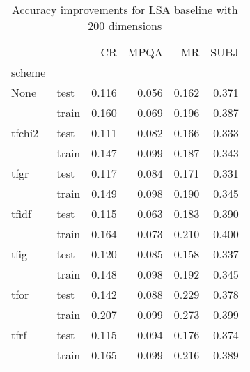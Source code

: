 \begin{table}[H]
\begin{center}

\begin{tabular}{llrrrr}
\toprule
{} &      &  CR &  MPQA &  MR &  SUBJ \\
scheme &  &            &              &            &              \\
\midrule
None & test &      0.116 &        0.056 &      0.162 &        0.371 \\
{} & train &      0.160 &        0.069 &      0.196 &        0.387 \\
tfchi2 & test &      0.111 &        0.082 &      0.166 &        0.333 \\
{} & train &      0.147 &        0.099 &      0.187 &        0.343 \\
tfgr & test &      0.117 &        0.084 &      0.171 &        0.331 \\
{} & train &      0.149 &        0.098 &      0.190 &        0.345 \\
tfidf & test &      0.115 &        0.063 &      0.183 &        0.390 \\
{} & train &      0.164 &        0.073 &      0.210 &        0.400 \\
tfig & test &      0.120 &        0.085 &      0.158 &        0.337 \\
{} & train &      0.148 &        0.098 &      0.192 &        0.345 \\
tfor & test &      0.142 &        0.088 &      0.229 &        0.378 \\
{} & train &      0.207 &        0.099 &      0.273 &        0.399 \\
tfrf & test &      0.115 &        0.094 &      0.176 &        0.374 \\
{} & train &      0.165 &        0.099 &      0.216 &        0.389 \\
\bottomrule
\end{tabular}

\caption[Accuracy improvements for LSA baseline with 200 dimensions]{Accuracy improvements for LSA baseline with 200 dimensions}
\label{tab:lsa:resuts:200}
\end{center}
\end{table}





